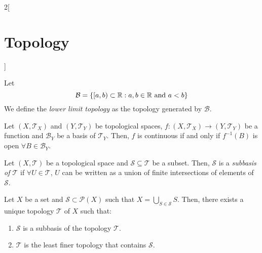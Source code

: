 \documentclass[../../../main.tex]{subfiles}
\begin{document}
\begin{multicols}{2}[\section{Topology}]
\begin{definition}
  \end{definition}
  \begin{definition}
    Let $$\mathcal{B}=\{[a,b)\subset\mathbb{R}:a,b\in\mathbb{R}\text{ and }a<b\}$$
    We define the \textit{lower limit topology} as the topology generated by $\mathcal{B}$.
  \end{definition}
  \begin{theorem}
    Let $(X,\mathcal{T}_X)$ and $(Y,\mathcal{T}_Y)$ be topological spaces, $f:(X,\mathcal{T}_X)\rightarrow (Y,\mathcal{T}_Y)$ be a function and $\mathcal{B}_Y$ be a basis of $\mathcal{T}_Y$. Then, $f$ is continuous if and only if $f^{-1}(B)$ is open $\forall B\in \mathcal{B}_Y$.
  \end{theorem}
  \begin{definition}
    Let $(X,\mathcal{T})$ be a topological space and $\mathcal{S}\subseteq\mathcal{T}$ be a subset. Then, $\mathcal{S}$ is a \textit{subbasis of $\mathcal{T}$} if $\forall U\in\mathcal{T}$, $U$ can be written as a union of finite intersections of elements of $\mathcal{S}$.
  \end{definition}
  \begin{prop}
    Let $X$ be a set and $\mathcal{S}\subset\mathcal{P}(X)$ such that $X=\bigcup_{S\in\mathcal{S}} S$. Then, there exists a unique topology $\mathcal{T}$ of $X$ such that:
    \begin{enumerate}
      \item $\mathcal{S}$ is a subbasis of the topology $\mathcal{T}$.
      \item $\mathcal{T}$ is the least finer topology that contains $\mathcal{S}$.
    \end{enumerate}
  \end{prop}

\end{multicols}
\end{document}
